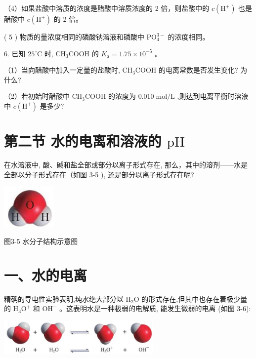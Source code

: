 \documentclass[10pt]{article}
\begin{document}
（4）如果盐酸中溶质的浓度是醋酸中溶质浓度的 2 倍，则盐酸中的 \(c\left( {\mathrm{H}}^{ + }\right)\) 也是醋酸中 \(c\left( {\mathrm{H}}^{ + }\right)\) 的 2 倍。

( 5 ) 物质的量浓度相同的磷酸钠溶液和磷酸中 \({\mathrm{{PO}}}_{4}^{3 - }\) 的浓度相同。

6. 已知 \({25}^{ \circ }\mathrm{C}\) 时, \({\mathrm{{CH}}}_{3}\mathrm{{COOH}}\) 的 \({K}_{\mathrm{a}} = {1.75} \times {10}^{-5}\) 。

（1）当向醋酸中加入一定量的盐酸时, \({\mathrm{{CH}}}_{3}\mathrm{{COOH}}\) 的电离常数是否发生变化? 为什么?

（2）若初始时醋酸中 \({\mathrm{{CH}}}_{3}\mathrm{{COOH}}\) 的浓度为 \({0.010}\mathrm{\;{mol}}/\mathrm{L}\) ,则达到电离平衡时溶液中 \(c\left( {\mathrm{H}}^{ + }\right)\) 是多少?

\section*{第二节 水的电离和溶液的 \(\mathrm{{pH}}\)}

在水溶液中, 酸、碱和盐全部或部分以离子形式存在, 那么，其中的溶剂——水是全部以分子形式存在（如图 3-5 ), 还是部分以离子形式存在呢?

\begin{center}
\includegraphics[max width=0.2\textwidth]{images/0190da9d-8bfd-732f-bc2c-0b21d0f13b91_68_439594.jpg}
\end{center}

图3-5 水分子结构示意图

\section*{一、水的电离}

精确的导电性实验表明,纯水绝大部分以 \({\mathrm{H}}_{2}\mathrm{O}\) 的形式存在,但其中也存在着极少量的 \({\mathrm{H}}_{3}{\mathrm{O}}^{ + }\) 和 \({\mathrm{{OH}}}^{ - }\) 。这表明水是一种极弱的电解质, 能发生微弱的电离 (如图 3-6):

\begin{center}
\includegraphics[max width=0.6\textwidth]{images/0190da9d-8bfd-732f-bc2c-0b21d0f13b91_68_396464.jpg}
\end{center}
\end{document}
